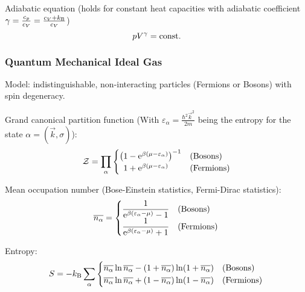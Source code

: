 			\noindent
			Adiabatic equation (holds for constant heat capacities with adiabatic coefficient $\gamma = \frac{c_p}{c_V} = \frac{c_V + k_{\text{B}}}{c_V}$)
			\begin{equation}
				p V^\gamma = \mathrm{const.}
			\end{equation}

		\subsubsection{Quantum Mechanical Ideal Gas}
			\noindent
			Model: indistinguishable, non-interacting particles (Fermions or Bosons) with spin degeneracy. \vsp

			\noindent
			Grand canonical partition function (With $\varepsilon_\alpha = \frac{\hbar^2 \vec{k}^2}{2m}$ being the entropy for the state $\alpha=(\vec{k},\sigma)$):
			\begin{equation}
				\mathcal{Z} = \prod_{\alpha}
					\begin{cases}
						\left( 1-\mathrm{e}^{\beta(\mu-\varepsilon_\alpha)}\right)^{-1} & \text{(Bosons)} \\
						\phantom{\big(} 1+\mathrm{e}^{\beta(\mu-\varepsilon_\alpha)} & \text{(Fermions)}
					\end{cases}
			\end{equation}

			\noindent
			Mean occupation number (Bose-Einstein statistics, Fermi-Dirac statistics):
			\begin{equation}
				\overline{n_\alpha} =
					\begin{cases}
						\dfrac{1}{\mathrm{e}^{\beta(\varepsilon_\alpha-\mu)} - 1} & \text{(Bosons)} \\
						\dfrac{1}{\mathrm{e}^{\beta(\varepsilon_\alpha-\mu)} + 1} & \text{(Fermions)}
					\end{cases} \\
			\end{equation}

			\noindent
			Entropy:
			\begin{equation}
				S= -k_{\text{B}}\sum_\alpha
					\begin{cases}
						\overline{n_\alpha} \ln \overline{n_\alpha} - (1+\overline{n_\alpha}) \ln (1+\overline{n_\alpha}) & \text{(Bosons)} \\
						\overline{n_\alpha} \ln \overline{n_\alpha} + (1-\overline{n_\alpha}) \ln (1-\overline{n_\alpha}) & \text{(Fermions)}
					\end{cases} \\
			\end{equation}

